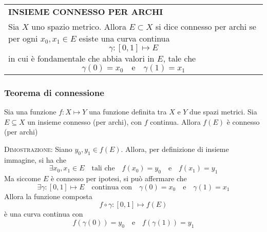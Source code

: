 \documentclass[a4paper]{extarticle}
\renewcommand\arraystretch{}
\begin{document}
\vspace{1em}
\setlength{\tabcolsep}{14pt}
\renewcommand{\arraystretch}{2}
\noindent
\begin{tabularx}{\textwidth}{@{}|P|@{}}
    \hline
    {\textbf{INSIEME CONNESSO PER ARCHI}}\\
    \parbox{\linewidth}{Sia $X$ uno spazio metrico. Allora $E \subset X$ si dice connesso per archi se per ogni $x_0,x_1 \in E$ esiste una curva continua
    \[\boxed{\gamma : [0,1] \longmapsto E}\]
    in cui è fondamentale che abbia valori in $E$, tale che
    \[\gamma(0)=x_0 \hspace{1em} \text{e} \hspace{1em} \gamma(1)=x_1\]
    \vspace{3mm}}\\
    \hline
\end{tabularx}

\vspace{1em}
\noindent
\subsubsection{Teorema di connessione}
Sia una funzione $f : X \longmapsto Y$ una funzione definita tra $X$ e $Y$ due spazi metrici. Sia $E \subseteq X$ un insieme connesso (per archi), con $f$ continua. Allora $f(E)$ è connesso (per archi)

\vspace{2em}
\noindent
\normalfont \normalsize
\textsc{Dimostrazione}: Siano $y_0,y_1 \in f(E)$. Allora, per definizione di insieme immagine, si ha che
\[\exists x_0,x_1 \in E \hspace{1em} \text{tali che} \hspace{1em} f(x_0) = y_0 \hspace{1em} \text{e} \hspace{1em} f(x_1)=y_1\]
Ma siccome $E$ è connesso per ipotesi, si può affermare che
\[\exists \gamma : [0,1] \longmapsto E \hspace{1em} \text{continua con} \hspace{1em} \gamma(0)=x_0 \hspace{1em} \text{e} \hspace{1em} \gamma(1) =x_1\]
Allora la funzione composta
\[f \circ \gamma : [0,1] \longmapsto f(E)\]
è una curva continua con
\[f(\gamma(0)) = y_0 \hspace{1em} \text{e} \hspace{1em} f(\gamma(1)) = y_1\]
\end{document}
